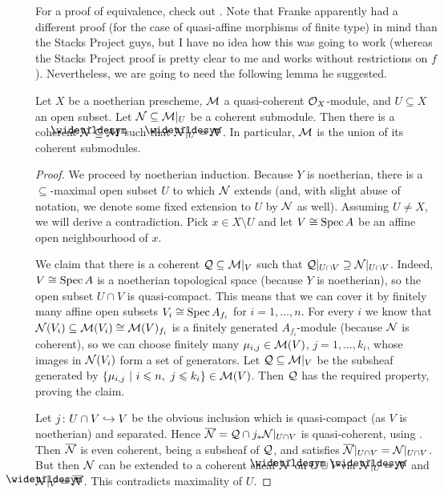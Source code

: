 \documentclass[a4paper,parskip=half,numbers=enddot, DIV=12]{scrreprt}
\renewcommand{\leq}{\leqslant}
\begin{document}
For a proof of equivalence, check out \cite[]{stacks-project}. Note that Franke apparently had a different proof (for the case of quasi-affine morphisms of finite type) in mind than the Stacks Project guys, but I have no idea how this was going to work (whereas the Stacks Project proof is pretty clear to me and works without restrictions on $f$). Nevertheless, we are going to need the following lemma he suggested.
\begin{lem}
	Let $X$ be a noetherian prescheme, $\mathcal{M}$ a quasi-coherent $\mathcal{O}_X$-module, and $U\subseteq X$ an open subset. Let $\mathcal{N}\subseteq \mathcal{M}|_U$ be a coherent submodule. Then there is a coherent $\snake{\Nn}\subseteq \Mm$ such that $\snake{\Nn}|_U=\Nn$. In particular, $\mathcal{M}$ is the union of its coherent submodules.
\end{lem}
\begin{proof}
	We proceed by noetherian induction. Because $Y$ is noetherian, there is a $\subseteq$-maximal open subset $U$ to which $\mathcal{N}$ extends (and, with slight abuse of notation, we denote some fixed extension to $U$ by $\mathcal{N}$ as well). Assuming $U\neq X$, we will derive a contradiction. Pick $x\in X\setminus U$ and let $V\cong \operatorname{Spec} A$ be an affine open neighbourhood of $x$. 
	
	We claim that there is a coherent $\mathcal{Q}\subseteq \mathcal{M}|_V$ such that $\mathcal{Q}|_{U\cap V}\supseteq \mathcal{N}|_{U\cap V}$. Indeed, $V\cong \operatorname{Spec} A$ is a noetherian topological space (because $Y$ is noetherian), so the open subset $U\cap V$ is quasi-compact. This means that we can cover it by finitely many affine open subsets $V_i\cong \operatorname{Spec} A_{f_i}$ for $i=1,\ldots,n$. For every $i$ we know that $\mathcal{N}(V_i)\subseteq \mathcal{M}(V_i)\cong \mathcal{M}(V)_{f_i}$ is a finitely generated $A_{f_i}$-module (because $\mathcal{N}$ is coherent), so we can choose finitely many $\mu_{i,j}\in \mathcal{M}(V)$, $j=1,\ldots,k_i$, whose images in $\mathcal{N}(V_i)$ form a set of generators. Let $\mathcal{Q}\subseteq \mathcal{M}|_V$ be the subsheaf generated by $\left\{\mu_{i,j}\st i\leq n,\ j\leq k_i\right\}\in\Mm(V)$. Then $\mathcal{Q}$ has the required property, proving the claim.
	
	Let $j\colon U\cap V\monomorphism V$ be the obvious inclusion which is quasi-compact (as $V$ is noetherian) and separated. Hence $\overline{\mathcal{N}}=\mathcal{Q}\cap j_*\mathcal{N}|_{U\cap V}$ is quasi-coherent, using \cite[Proposition~1.5.2]{alggeo1}. Then $\overline{\mathcal{N}}$ is even coherent, being a subsheaf of $\mathcal{Q}$, and satisfies $\overline{\mathcal{N}}|_{U\cap V}=\mathcal{N}|_{U\cap V}$. But then $\mathcal{N}$ can be extended to a coherent sheaf $\snake{\Nn}$ on $U\cup V$ via $\snake{\Nn}|_U=\Nn$ and $\snake{\Nn}|_V=\ov{\Nn}$. This contradicts maximality of $U$.
\end{proof}
\end{document}
